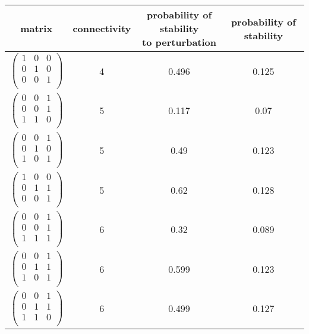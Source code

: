 \documentclass{amsart}
\theoremstyle{definition}
\theoremstyle{remark}
\numberwithin{equation}{section}
\begin{document}
\begin{longtable}{ c || c | c | c }
\hline
matrix & connectivity & \specialcell{probability of stability\\to perturbation} & probability of stability\\
\hline
$\begin{pmatrix}
1 & 0 & 0\\
0 & 1 & 0\\
0 & 0 & 1\\
\end{pmatrix}$ & 4 & 0.496 & 0.125\\
$\begin{pmatrix}
0 & 0 & 1\\
0 & 0 & 1\\
1 & 1 & 0\\
\end{pmatrix}$ & 5 & 0.117 & 0.07\\
$\begin{pmatrix}
0 & 0 & 1\\
0 & 1 & 0\\
1 & 0 & 1\\
\end{pmatrix}$ & 5 & 0.49 & 0.123\\
$\begin{pmatrix}
1 & 0 & 0\\
0 & 1 & 1\\
0 & 0 & 1\\
\end{pmatrix}$ & 5 & 0.62 & 0.128\\
$\begin{pmatrix}
0 & 0 & 1\\
0 & 0 & 1\\
1 & 1 & 1\\
\end{pmatrix}$ & 6 & 0.32 & 0.089\\
$\begin{pmatrix}
0 & 0 & 1\\
0 & 1 & 1\\
1 & 0 & 1\\
\end{pmatrix}$ & 6 & 0.599 & 0.123\\
$\begin{pmatrix}
0 & 0 & 1\\
0 & 1 & 1\\
1 & 1 & 0\\
\end{pmatrix}$ & 6 & 0.499 & 0.127\\

\end{longtable}
\end{document}
